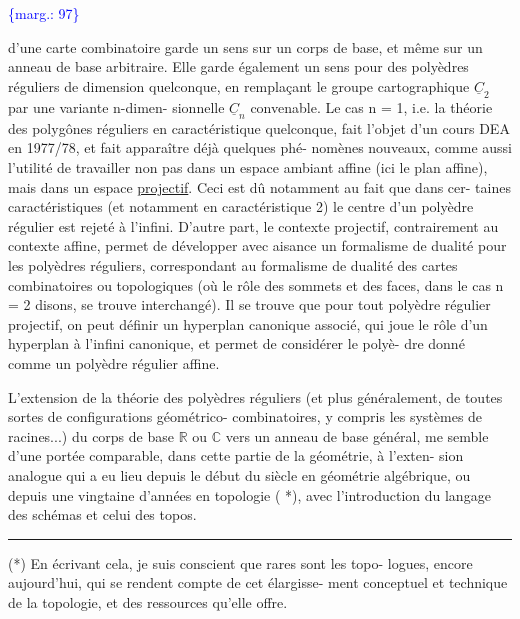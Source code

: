 \documentclass[11pt]{article}
\newcommand{\scanpage}[1]{\par\bigskip\noindent{\small\sffamily[scan #1]}\par}
\newcommand{\mspage}[1]{{\small\sffamily[p.\,#1]}}
\newcommand{\margin}[1]{\textcolor{blue}{\{\textsf{marg.:} #1\}}}
\newcommand{\uline}[1]{\underline{#1}}
\begin{document}
\margin{97}

\clearpage
\scanpage{119/98}
\mspage{20}

d'une carte combinatoire garde un sens sur un corps de base, et
même sur un anneau de base arbitraire. Elle garde également un
sens pour des polyèdres réguliers de dimension quelconque, en
remplaçant le groupe cartographique $\underline{C}_2$ par une variante n-dimen-%
sionnelle $\underline{C}_n$ convenable. Le cas n = 1, i.e. la théorie des
polygônes réguliers en caractéristique quelconque, fait l'objet
d'un cours DEA en 1977/78, et fait apparaître déjà quelques phé-%
nomènes nouveaux, comme aussi l'utilité de travailler non pas
dans un espace ambiant affine (ici le plan affine), mais dans
un espace \uline{projectif}. Ceci est dû notamment au fait que dans cer-%
taines caractéristiques (et notamment en caractéristique 2) le
centre d'un polyèdre régulier est rejeté à l'infini. D'autre
part, le contexte projectif, contrairement au contexte affine,
permet de développer avec aisance un formalisme de dualité pour
les polyèdres réguliers, correspondant au formalisme de dualité
des cartes combinatoires ou topologiques (où le rôle des sommets
et des faces, dans le cas n = 2 disons, se trouve interchangé).
Il se trouve que pour tout polyèdre régulier projectif, on peut
définir un hyperplan canonique associé, qui joue le rôle d'un
hyperplan à l'infini canonique, et permet de considérer le polyè-%
dre donné comme un polyèdre régulier affine.

L'extension de la théorie des polyèdres réguliers (et
plus généralement, de toutes sortes de configurations géométrico-%
combinatoires, y compris les systèmes de racines...) du corps de
base $\mathbb{R}$ ou $\mathbb{C}$ vers un anneau de base général, me semble d'une
portée comparable, dans cette partie de la géométrie, à l'exten-%
sion analogue qui a eu lieu depuis le début du siècle en géométrie
algébrique, ou depuis une vingtaine d'années en topologie ( *),
avec l'introduction du langage des schémas et celui des topos.

\rule{4cm}{0.4pt}

(*) En écrivant cela, je suis conscient que rares sont les topo-%
logues, encore aujourd'hui, qui se rendent compte de cet élargisse-%
ment conceptuel et technique de la topologie, et des ressources
qu'elle offre.
\end{document}
